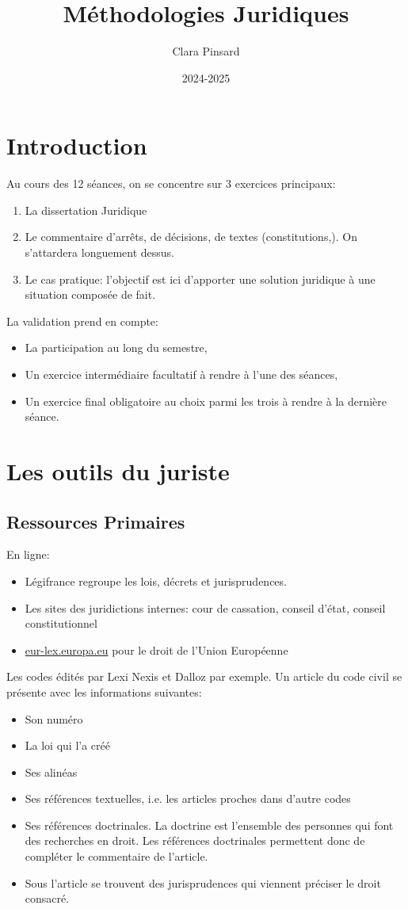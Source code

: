 \documentclass[math]{cours}
\author{Clara Pinsard}
\title{Méthodologies Juridiques}
\date{2024-2025}
\begin{document}
\bettertitle
\section*{Introduction}
Au cours des 12 séances, on se concentre sur 3 exercices principaux:
\begin{enumerate}
	\item La dissertation Juridique
	\item Le commentaire d'arrêts, de décisions, de textes (constitutions,).
		On s'attardera longuement dessus.
	\item Le cas pratique: l'objectif est ici d'apporter une solution juridique à une situation composée de fait.
\end{enumerate}

La validation prend en compte:
\begin{itemize}
	\item La participation au long du semestre,
	\item Un exercice intermédiaire facultatif à rendre à l'une des séances,
	\item Un exercice final obligatoire au choix parmi les trois à rendre à la dernière séance.
\end{itemize}

\section*{Les outils du juriste}
\subsection*{Ressources Primaires}
En ligne:
\begin{itemize}
	\item Légifrance regroupe les lois, décrets et jurisprudences.
	\item Les sites des juridictions internes: cour de cassation, conseil d'état, conseil constitutionnel
	\item \url{eur-lex.europa.eu} pour le droit de l'Union Européenne
\end{itemize}

Les codes édités par Lexi Nexis et Dalloz par exemple.
Un article du code civil se présente avec les informations suivantes:
\begin{itemize}
	\item Son numéro
	\item La loi qui l'a créé
	\item Ses alinéas
	\item Ses références textuelles, i.e. les articles proches dans d'autre codes
	\item Ses références doctrinales. La doctrine est l'ensemble des personnes qui font des recherches en droit.
		Les références doctrinales permettent donc de compléter le commentaire de l'article.
	\item Sous l'article se trouvent des jurisprudences qui viennent préciser le droit consacré.
\end{itemize}
\end{document}
